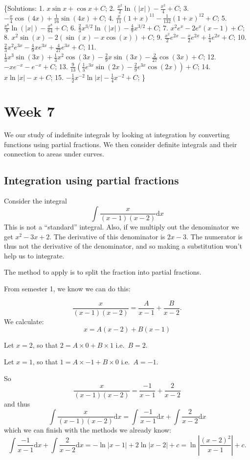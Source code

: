 \documentclass[
  11pt,
  oneside]{book}
\newcommand{\slide}{}
\theoremstyle{definition}
\theoremstyle{definition}
\theoremstyle{definition}
\theoremstyle{definition}
\theoremstyle{remark}
\begin{document}
\{Solutions:
1. \(x\sin x+\cos x + C\);
2. \(\frac{x^2}{2}\ln(|x|) - \frac{x^2}{4}+C\);
3. \(-\frac{x}{4}\cos(4x)+\frac{1}{16}\sin(4x)+C\);
4. \(\frac{x}{11}(1+x)^{11} - \frac{1}{132}(1+x)^{12}+C\);
5. \(\frac{x^8}{8}\ln(|x|) - \frac{x^8}{64}+C\);
6. \(\frac{2}{3}x^{3/2}\ln(|x|) - \frac{4}{9}x^{3/2}+C\);
7. \(x^2e^x - 2e^x(x-1)+C\);
8. \(x^2\sin(x) - 2(\sin(x)-x\cos(x))+C\);
9. \(\frac{x^2}{2}e^{2x}-\frac{x}{2}e^{2x}+\frac{1}{4}e^{2x}+C\);
10. \(\frac{2}{3}x^2e^{3x}-\frac{4}{9}xe^{3x}+\frac{4}{27}e^{3x}+C\);
11. \(\frac{1}{3}x^3\sin(3x)+\frac{1}{3}x^2\cos(3x)-\frac{2}{9}x\sin(3x)-\frac{2}{27}\cos(3x)+C\);
12. \(-xe^{-x}-e^{-x}+C\);
13. \(\frac{9}{13}\left( \frac{1}{3}e^{3x}\sin(2x)-\frac{2}{9}e^{3x}\cos(2x) \right)+C\);
14. \(x\ln|x| - x +C\);
15. \(-\frac{1}{2}x^{-2}\ln|x| - \frac{1}{4}x^{-2} + C\);
\}

\chapter{Week 7}\label{week-seven}

We our study of indefinite integrals by looking at integration by converting functions using partial fractions. We then consider definite integrals and their connection to areas under curves.
\slide

\section{Integration using partial fractions}\label{integration-using-partial-fractions}

Consider the integral
\[
\int\frac{x}{(x-1)(x-2)}\mathrm{d}x
\]
This is not a ``standard'' integral. Also, if we multiply out the denominator we get \(x^2 - 3x + 2\). The derivative of this denominator is \(2x - 3\). The numerator is thus not the derivative of the denominator, and so making a substitution won't help us to integrate.

The method to apply is to split the fraction into partial fractions.

From semester 1, we know we can do this:

\begin{notslides}

\[
\frac{x}{(x-1)(x-2)} = \frac A{x-1}+\frac B{x-2}.
\]
We calculate:
\[
x = A(x-2)+B(x-1)
\]

Let \(x=2\), so that \(2=A\times0+B\times1\) i.e.~\(B=2\).

Let \(x=1\), so that \(1=A\times-1+B\times0\) i.e.~\(A=-1\).

So
\[
\frac{x}{(x-1)(x-2)} = \frac {-1}{x-1}+\frac 2{x-2}
\]
and thus
\[
\int\frac{x}{(x-1)(x-2)}\mathrm{d}x = \int\frac {-1}{x-1}\mathrm{d}x+\int\frac 2{x-2}\mathrm{d}x
\]
which we can finish with the methods we already know:
\[
\int\frac {-1}{x-1}\mathrm{d}x+\int\frac 2{x-2}\mathrm{d}x = -\ln|x-1|+2\ln|x-2|+c = \ln\left|\frac{(x-2)^2}{x-1}\right|+c.
\]

\end{notslides}
\end{document}
